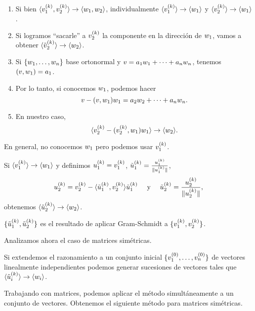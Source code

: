 \begin{enumerate}
\item Si bien $\langle \vb_1^{(k)}, \vb_2^{(k)} \rangle \rightarrow \langle \wb_1, \wb_2 \rangle$, individualmente  $\langle \vb_1^{(k)} \rangle \rightarrow \langle \wb_1 \rangle$ y  $\langle \vb_2^{(k)} \rangle \rightarrow \langle \wb_1\rangle $.

\item Si logramos ``sacarle'' a $\vb_2^{(k)}$ la componente en la dirección de $\wb_1$, vamos a obtener $\langle \tilde \vb_2^{(k)} \rangle \rightarrow \langle \wb_2 \rangle $.

\item Si $\{\wb_1, \dots, \wb_n\}$ base ortonormal y $\vb = a_1 \wb_1 + \dots + a_n \wb_n$, tenemos $(\vb, \wb_1) = a_1$.

\item Por lo tanto, si conocemos $\wb_1$, podemos hacer
$$\vb - ( \vb , \wb_1 ) \wb_1 = a_2 \wb_2 + \dots + a_n \wb_n.$$

\item En nuestro caso,
$$\langle \vb_2^{(k)} - ( \vb_2^{(k)} , \wb_1 ) \wb_1 \rangle \rightarrow \langle  \wb_2 \rangle.$$

\end{enumerate}

En general, no conocemos $\wb_1$ pero podemos usar $\vb_1^{(k)}$.

Si $\langle \vb_1^{(k)} \rangle \rightarrow \langle \wb_1 \rangle$ y definimos $\ub_1^{(k)} = \vb_1^{(k)}$, $\tilde \ub_1^{(k)} = \frac{\ub_1^{(k)}}{\|\ub_1^{(k)}\|}$,
$$
\ub_2^{(k)} =
\vb_2^{(k)} - \langle \tilde \ub_1^{(k)}, \vb_2^{(k)} \rangle \tilde \ub_1^{(k)} \quad \text{ y } \quad \tilde \ub_2^{(k)} = \frac{\ub_2^{(k)}}{\|\ub_2^{(k)}\|},
$$
obtenemos $\langle \tilde \ub_2^{(k)} \rangle \rightarrow \langle \wb_2 \rangle$.

\begin{remark} $\{\tilde \ub_1^{(k)}, \tilde \ub_2^{(k)} \}$ es el resultado de aplicar Gram-Schmidt a $\{\vb_1^{(k)}, \vb_2^{(k)} \}$.
\end{remark}

Analizamos ahora el caso de matrices simétricas.

Si extendemos el razonamiento a un conjunto inicial $\{\vb_1^{(0)}, \dots, \vb_n^{(0)} \}$ de vectores linealmente independientes podemos generar sucesiones de vectores tales que $\langle \tilde \ub_i^{(k)} \rangle \rightarrow \langle \wb_i \rangle$.

Trabajando con matrices, podemos aplicar el método simultáneamente a un conjunto de vectores. Obtenemos el siguiente método para matrices simétricas.

